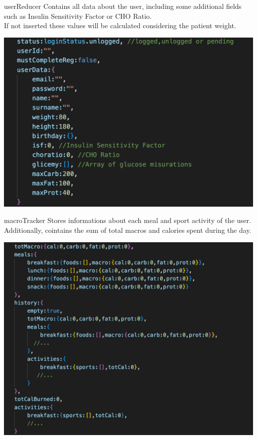 \documentclass[12pt,hidelinks]{article}
\begin{document}
	\begin{docCommand}{userReducer}{}
    Contains all data about the user, including some additional fields such as
	Insulin Sensitivity Factor or CHO Ratio.\\
	If not inserted these values will be calculated considering the patient weight.

	\begin{center}
		\includegraphics[scale=0.6]{userReduces}
	\end{center}

\end{docCommand}



\begin{docCommand}{macroTracker}{}
	Stores informations about each meal and sport activity of the user. Additionally, cointains 
	the sum of total macros and calories spent during the day. 
	\begin{center}
		\includegraphics[scale=0.5]{macroTracker}
	\end{center}

\end{docCommand}
\newpage
{}
\end{document}
